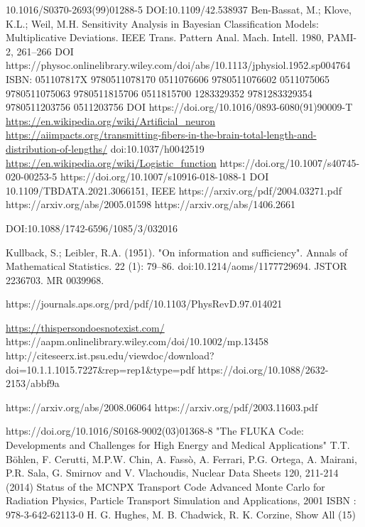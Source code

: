 \begin{thebibliography}{99}

 10.1016/S0370-2693(99)01288-5
 DOI:10.1109/42.538937
 Ben-Bassat, M.; Klove, K.L.; Weil, M.H. Sensitivity Analysis in Bayesian Classification Models: Multiplicative Deviations. IEEE Trans. Pattern Anal. Mach. Intell. 1980, PAMI-2, 261–266
  DOI https://physoc.onlinelibrary.wiley.com/doi/abs/10.1113/jphysiol.1952.sp004764
  ISBN:	051107817X 9780511078170 0511076606 9780511076602 0511075065 9780511075063 9780511815706 0511815700 1283329352 9781283329354 9780511203756 0511203756
 DOI https://doi.org/10.1016/0893-6080(91)90009-T
 \url{https://en.wikipedia.org/wiki/Artificial_neuron}
 \url{https://aiimpacts.org/transmitting-fibers-in-the-brain-total-length-and-distribution-of-lengths/}
 doi:10.1037/h0042519
 \url{https://en.wikipedia.org/wiki/Logistic_function}
 https://doi.org/10.1007/s40745-020-00253-5
https://doi.org/10.1007/s10916-018-1088-1
  DOI 10.1109/TBDATA.2021.3066151, IEEE
 https://arxiv.org/pdf/2004.03271.pdf
 https://arxiv.org/abs/2005.01598
 https://arxiv.org/abs/1406.2661

 DOI:10.1088/1742-6596/1085/3/032016

  Kullback, S.; Leibler, R.A. (1951). "On information and sufficiency". Annals of Mathematical Statistics. 22 (1): 79–86. doi:10.1214/aoms/1177729694. JSTOR 2236703. MR 0039968.

 https://journals.aps.org/prd/pdf/10.1103/PhysRevD.97.014021

 \url{https://thispersondoesnotexist.com/}
 https://aapm.onlinelibrary.wiley.com/doi/10.1002/mp.13458
 http://citeseerx.ist.psu.edu/viewdoc/download?doi=10.1.1.1015.7227&rep=rep1&type=pdf
 https://doi.org/10.1088/2632-2153/abbf9a


 https://arxiv.org/abs/2008.06064
 https://arxiv.org/pdf/2003.11603.pdf


 https://doi.org/10.1016/S0168-9002(03)01368-8
 "The FLUKA Code: Developments and Challenges for High Energy and Medical Applications" T.T. Böhlen, F. Cerutti, M.P.W. Chin, A. Fassò, A. Ferrari, P.G. Ortega, A. Mairani, P.R. Sala, G. Smirnov and V. Vlachoudis, Nuclear Data Sheets 120, 211-214 (2014)
 Status of the MCNPX Transport Code Advanced Monte Carlo for Radiation Physics, Particle Transport Simulation and Applications, 2001 ISBN : 978-3-642-62113-0 H. G. Hughes, M. B. Chadwick, R. K. Corzine, Show All (15)


\end{thebibliography}
